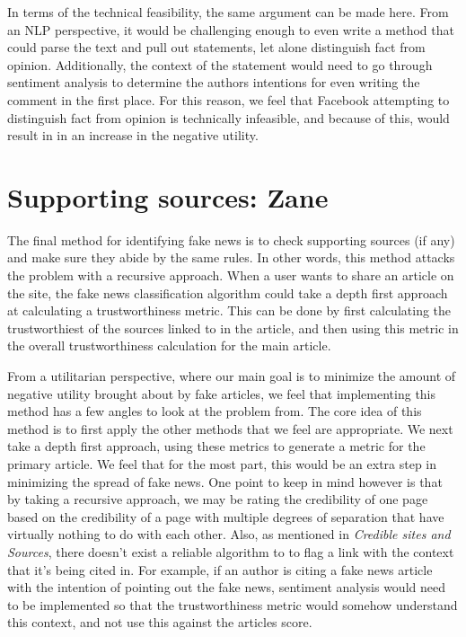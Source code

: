 \documentclass[12pt]{article}
\begin{document}
In terms of the technical feasibility, the same argument can be made here. From an NLP perspective, it would be challenging enough to even write a method that could parse the text and pull out statements, let alone distinguish fact from opinion. Additionally, the context of the statement would need to go through sentiment analysis to determine the authors intentions for even writing the comment in the first place. For this reason, we feel that Facebook attempting to distinguish fact from opinion is technically infeasible, and because of this, would result in in an increase in the negative utility.

\section{Supporting sources: Zane}
The final method for identifying fake news is to check supporting sources (if any) and make sure they abide by the same rules. In other words, this method attacks the problem with a recursive approach. When a user wants to share an article on the site, the fake news classification algorithm could take a depth first approach at calculating a trustworthiness metric. This can be done by first calculating the trustworthiest of the sources linked to in the article, and then using this metric in the overall trustworthiness calculation for the main article.

From a utilitarian perspective, where our main goal is to minimize the amount of negative utility brought about by fake articles, we feel that implementing this method has a few angles to look at the problem from. The core idea of this method is to first apply the other methods that we feel are appropriate. We next take a depth first approach, using these metrics to generate a metric for the primary article. We feel that for the most part, this would be an extra step in minimizing the spread of fake news. One point to keep in mind however is that by taking a recursive approach, we may be rating the credibility of one page based on the credibility of a page with multiple degrees of separation that have virtually nothing to do with each other. Also, as mentioned in \textit{Credible sites and Sources}, there doesn't exist a reliable algorithm to to flag a link with the context that it's being cited in. For example, if an author is citing a fake news article with the intention of pointing out the fake news, sentiment analysis would need to be implemented so that the trustworthiness metric would somehow understand this context, and not use this against the articles score.
\end{document}
